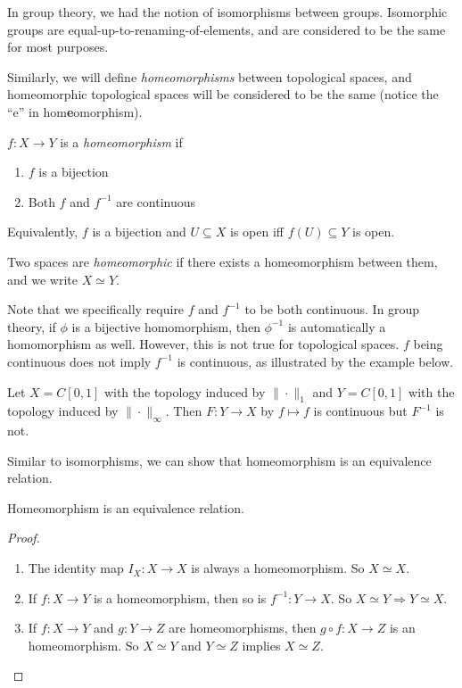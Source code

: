 \documentclass[a4paper]{article}
\begin{document}
In group theory, we had the notion of isomorphisms between groups. Isomorphic groups are equal-up-to-renaming-of-elements, and are considered to be the same for most purposes.

Similarly, we will define \emph{homeomorphisms} between topological spaces, and homeomorphic topological spaces will be considered to be the same (notice the ``e'' in hom\textbf{e}omorphism).
\begin{defi}[Homeomorphism]
  $f: X\to Y$ is a \emph{homeomorphism} if
  \begin{enumerate}
    \item $f$ is a bijection
    \item Both $f$ and $f^{-1}$ are continuous
  \end{enumerate}
  Equivalently, $f$ is a bijection and $U\subseteq X$ is open iff $f(U)\subseteq Y$ is open.

  Two spaces are \emph{homeomorphic} if there exists a homeomorphism between them, and we write $X\simeq Y$.
\end{defi}
Note that we specifically require $f$ and $f^{-1}$ to be both continuous. In group theory, if $\phi$ is a bijective homomorphism, then $\phi^{-1}$ is automatically a homomorphism as well. However, this is not true for topological spaces. $f$ being continuous does not imply $f^{-1}$ is continuous, as illustrated by the example below.

\begin{eg}
  Let $X = C[0, 1]$ with the topology induced by $\|\cdot \|_1$ and $Y = C[0, 1]$ with the topology induced by $\|\cdot\|_\infty$. Then $F: Y\to X$ by $f\mapsto f$ is continuous but $F^{-1}$ is not.
\end{eg}

Similar to isomorphisms, we can show that homeomorphism is an equivalence relation.
\begin{lemma}
  Homeomorphism is an equivalence relation.
\end{lemma}

\begin{proof}\leavevmode
  \begin{enumerate}
    \item The identity map $I_X: X\to X$ is always a homeomorphism. So $X\simeq X$.
    \item If $f: X\to Y$ is a homeomorphism, then so is $f^{-1}:Y\to X$. So $X\simeq Y \Rightarrow Y\simeq X$.
    \item If $f: X\to Y$ and $g: Y\to Z$ are homeomorphisms, then $g\circ f: X\to Z$ is an homeomorphism. So $X\simeq Y$ and $Y\simeq Z$ implies $X\simeq Z$.
  \end{enumerate}
\end{proof}
\end{document}
